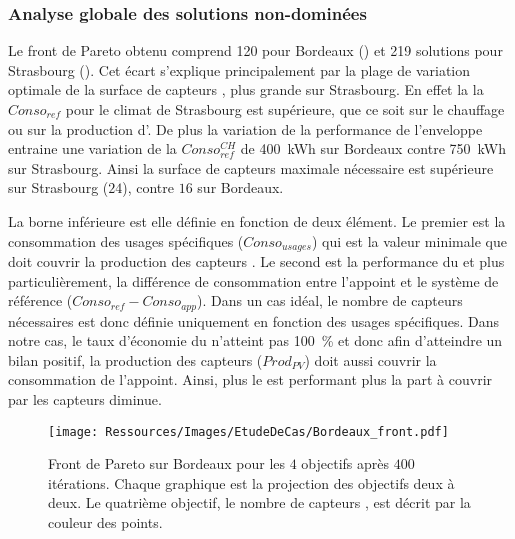 \subsubsection{Analyse globale des solutions non-dominées} %
\label{ssub:analyse_globale_des_solutions_non_dominees}
Le front de Pareto obtenu comprend \num{120} pour Bordeaux ()
et \num{219} solutions pour Strasbourg (). Cet écart s’explique
principalement par la plage de variation optimale de la surface de capteurs , plus grande
sur Strasbourg. En effet la la $Conso_{ref}$ pour le climat de Strasbourg est supérieure, que ce
soit sur le chauffage ou sur la production d’.
De plus la variation de la performance de l’enveloppe entraine une variation de
la $Conso_{ref}^{CH}$ de \SI{400}{kWh} sur Bordeaux contre \SI{750}{kWh} sur Strasbourg.
Ainsi la surface de capteurs  maximale nécessaire est supérieure sur Strasbourg ($24$),
contre $16$ sur Bordeaux.

La borne inférieure est elle définie en fonction de deux élément. Le premier est la
consommation des usages spécifiques ($Conso_{usages}$) qui
est la valeur minimale que doit couvrir la production des capteurs . Le second
est la performance du  et plus particulièrement, la différence
de consommation entre l’appoint et le système de référence ($Conso_{ref} - Conso_{app}$).
Dans un cas idéal, le nombre de capteurs  nécessaires est donc définie uniquement
en fonction des usages spécifiques. Dans notre cas, le taux d’économie du 
n’atteint pas \SI{100}{\percent} et donc afin d’atteindre un bilan positif, la
production des capteurs  ($Prod_{PV}$) doit aussi couvrir la consommation
de l’appoint. Ainsi, plus le  est performant plus la part à couvrir par les capteurs 
diminue.


\begin{figure}
    \centering
    \texttt{[image: Ressources/Images/EtudeDeCas/Bordeaux\_front.pdf]}
    \caption[Front de Pareto sur Bordeaux pour les $4$ objectifs après $400$ itérations]
             {Front de Pareto sur Bordeaux pour les $4$ objectifs après $400$ itérations.
              Chaque graphique est la projection des objectifs deux à deux.
              Le quatrième objectif, le nombre de capteurs , est décrit par la couleur des points.}
    \label{fig:front_pareto_bordeaux}
\end{figure}

